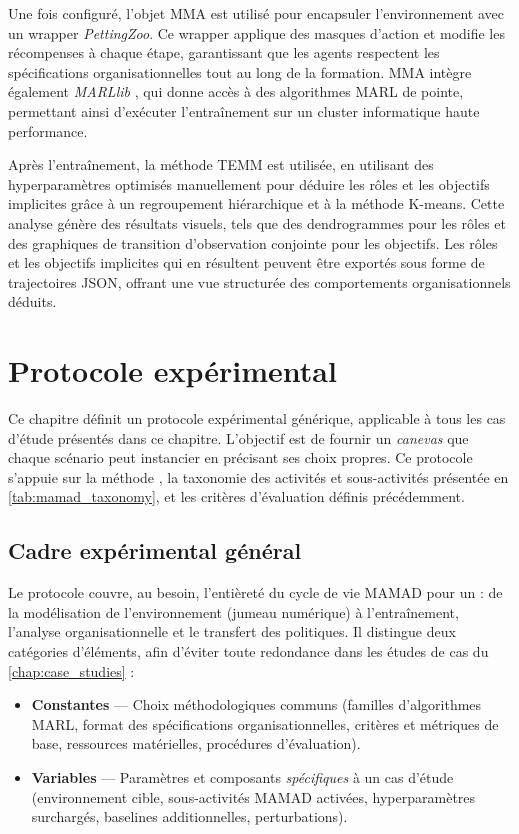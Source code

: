 Une fois configuré, l'objet MMA est utilisé pour encapsuler l'environnement avec un wrapper \textit{PettingZoo}. Ce wrapper applique des masques d'action et modifie les récompenses à chaque étape, garantissant que les agents respectent les spécifications organisationnelles tout au long de la formation. MMA intègre également \textit{MARLlib} \cite{hu2021marlib}, qui donne accès à des algorithmes MARL de pointe, permettant ainsi d'exécuter l'entraînement sur un cluster informatique haute performance.

Après l'entraînement, la méthode TEMM est utilisée, en utilisant des hyperparamètres optimisés manuellement pour déduire les rôles et les objectifs implicites grâce à un regroupement hiérarchique et à la méthode K-means. Cette analyse génère des résultats visuels, tels que des dendrogrammes pour les rôles et des graphiques de transition d'observation conjointe pour les objectifs. Les rôles et les objectifs implicites qui en résultent peuvent être exportés sous forme de trajectoires JSON, offrant une vue structurée des comportements organisationnels déduits.




\clearpage
\thispagestyle{empty}
\null
\newpage

\chapter{Protocole expérimental}
\label{chap:experimental_protocol}

Ce chapitre définit un protocole expérimental générique, applicable à tous les cas d'étude présentés dans ce chapitre.
L'objectif est de fournir un \textit{canevas} que chaque scénario peut instancier en précisant ses choix propres.
Ce protocole s'appuie sur la méthode , la taxonomie des activités et sous-activités présentée en \autoref{tab:mamad_taxonomy}, et les critères d'évaluation définis précédemment.

\section{Cadre expérimental général}
\label{sec:generic_experimental_framework}

Le protocole couvre, au besoin, l’entièreté du cycle de vie MAMAD pour un  : de la modélisation de l’environnement (jumeau numérique) à l’entraînement, l’analyse organisationnelle et le transfert des politiques. Il distingue deux catégories d’éléments, afin d’éviter toute redondance dans les études de cas du \autoref{chap:case_studies} :
\begin{itemize}
  \item \textbf{Constantes} — Choix méthodologiques communs (familles d’algorithmes MARL, format des spécifications organisationnelles, critères et métriques de base, ressources matérielles, procédures d’évaluation).
  \item \textbf{Variables} — Paramètres et composants \textit{spécifiques} à un cas d’étude (environnement cible, sous-activités MAMAD activées, hyperparamètres surchargés, baselines additionnelles, perturbations).
\end{itemize}

